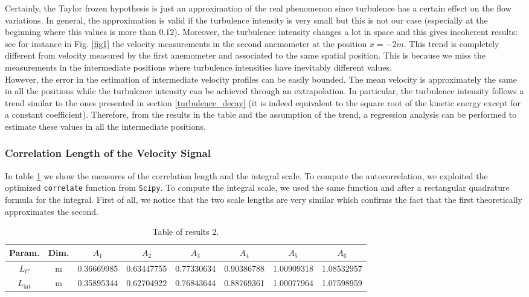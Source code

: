 \documentclass[11pt,titlepage]{article}
\begin{document}
Certainly, the Taylor frozen hypothesis is just an approximation of the real phenomenon since turbulence has a certain effect on the flow variations. In general, the approximation is valid if the turbulence intensity is very small but this is not our case (especially at the beginning where this values is more than $0.12$). Moreover, the turbulence intensity changes a lot in space and this gives incoherent results: see for instance in Fig. \ref{fig1} the velocity measurements in the second anemometer at the position $x=-2m$. This trend is completely different from velocity measured by the first anemometer and associated to the same spatial position. This is because we miss the measurements in the intermediate positions where turbulence intensities have inevitably different values. \\
However, the error in the estimation of intermediate velocity profiles can be easily bounded. The mean velocity is approximately the same in all the positions while the turbulence intensity can be achieved through an extrapolation. In particular, the turbulence intensity follows a trend similar to the ones presented in section \ref{turbulence_decay} (it is indeed equivalent to the square root of the kinetic energy except for a constant coefficient). Therefore, from the results in the table and the assumption of the trend, a regression analysis can be performed to estimate these values in all the intermediate positions.

\subsubsection{Correlation Length of the Velocity Signal} \label{correlation_length_of_the_velocity}
In table \ref{tab2} we show the measures of the correlation length and the integral scale. To compute the autocorrelation, we exploited the optimized \texttt{correlate} function from \texttt{Scipy}. To compute the integral scale, we used the same function and after a rectangular quadrature formula for the integral. First of all, we notice that the two scale lengths are very similar which confirms the fact that the first theoretically approximates the second.
\begin{table}[h]
\centering
\caption{Table of results 2.} \label{tab2}
    \begin{tabular}{ | c | c | c | c | c | c | c | c |}
    \hline
    Param. & Dim. & $A_1$ & $A_2$ & $A_3$ & $A_4$ & $A_5$ & $A_6$ \\
    \hline
    $L_C$ & m & 0.36669985& 0.63447755& 0.77330634& 0.90386788 &1.00909318 &1.08532957 \\
    \hline
    $L_\mathrm{int}$ &m & 0.35895344& 0.62704922& 0.76843644& 0.88769361 &1.00077964 &1.07598959 \\
    \hline
    \end{tabular}
\end{table}
\end{document}
